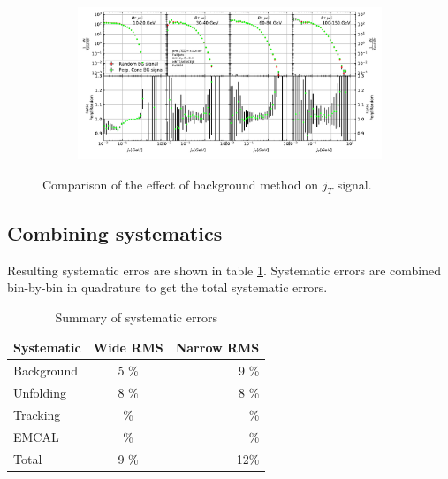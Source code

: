 \begin{figure}
\centering
\begin{subfigure}{0.95\textwidth}
\includegraphics[width=\textwidth]{results/MixedFullJetsR04SignalBackgroundComparison.pdf}
\end{subfigure}
\caption{Comparison of the effect of background method on $j_T$ signal.}
\label{fig:signalbg}
\end{figure}



\subsection{Combining systematics}
Resulting systematic erros are shown in table \ref{tab:systematics}. Systematic errors are combined bin-by-bin in quadrature to get the total systematic errors.
\begin{table}[htb]
\centering
\caption{Summary of systematic errors}
\label{tab:systematics}
\begin{tabular}{ l | c | r }
  Systematic & Wide RMS & Narrow RMS \\
    \hline			
  Background & 5 \% & 9 \% \\
  Unfolding & 8 \% & 8 \% \\
  Tracking & \% & \% \\ 
  EMCAL & \% & \% \\
  Total & 9 \% & 12\% \\
  \hline
  \end{tabular}
  \end{table}